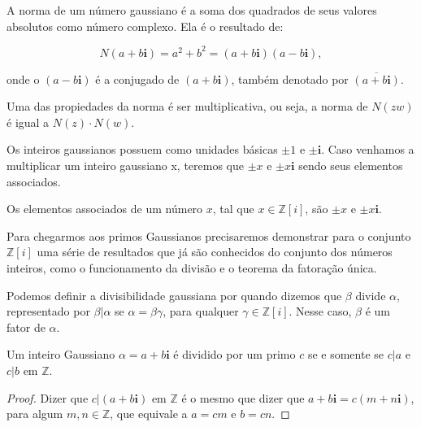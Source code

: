 \begin{Df}
A norma de um n\'umero gaussiano \'e a soma dos quadrados de seus valores absolutos como n\'umero complexo. Ela \'e o resultado de:

$$N(a+b\textbf{i}) = a^2 + b^2 = (a+b\textbf{i})(a-b\textbf{i}),$$

onde o $(a-b\textbf{i})$ \'e a conjugado de $(a+b\textbf{i})$, tamb\'em denotado por $\overline{(a+b\textbf{i})}$.
\end{Df}

Uma das propiedades da norma \'e ser multiplicativa, ou seja, a norma de $N(zw)$ \'e igual a $N(z) \cdot N(w)$.

Os inteiros gaussianos possuem como unidades b\'asicas $\pm 1$ e $\pm \textbf{i}$. Caso venhamos a multiplicar um inteiro gaussiano x, teremos que $\pm x$ e $\pm x\textbf{i}$ sendo seus elementos associados.

\begin{Df}

Os elementos associados de um n\'umero $x$, tal que $x \in \mathbb{Z}[i]$, s\~ao $\pm x$ e $\pm x\textbf{i}$.

\end{Df}

Para chegarmos aos primos Gaussianos precisaremos demonstrar para o conjunto $\mathbb{Z}[i]$ uma s\'erie de resultados que j\'a s\~ao conhecidos do conjunto dos n\'umeros inteiros, como o funcionamento da divis\~ao e o teorema da fatora\c{c}\~ao \'unica.

Podemos definir a divisibilidade gaussiana por quando dizemos que $\beta$ divide $\alpha$, representado por $\beta | \alpha$ se $\alpha = \beta \gamma$, para qualquer $\gamma \in \mathbb{Z}[i] $. Nesse caso, $\beta$ \'e um fator de $\alpha$.

\begin{Th}\label{div_gaussiana1}

Um inteiro Gaussiano $\alpha = a+b\textbf{i}$ \'e dividido por um primo $c$ se e somente se $c|a$ e $c|b$ em $\mathbb{Z}$.

\end{Th}

\begin{proof}

Dizer que $c|(a+b\textbf{i})$ em $\mathbb{Z}$ \'e o mesmo que dizer que $a+b\textbf{i} = c(m +  n\textbf{i})$, para algum $m, n \in \mathbb{Z}$, que equivale a $a=cm$ e $b=cn$.

\end{proof}

